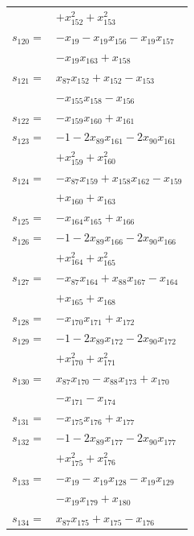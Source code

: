 \begin{longtable}{@{}r@{\;}l@{}}
 & \(\displaystyle +x_{152}^{2} +x_{153}^{2}\) \\[3pt]
\(s_{120}=\) & \(\displaystyle -x_{19} -x_{19}x_{156} -x_{19}x_{157}\) \\
 & \(\displaystyle -x_{19}x_{163} +x_{158}\) \\[3pt]
\(s_{121}=\) & \(\displaystyle x_{87}x_{152} +x_{152} -x_{153}\) \\
 & \(\displaystyle -x_{155}x_{158} -x_{156}\) \\[3pt]
\(s_{122}=\) & \(\displaystyle -x_{159}x_{160} +x_{161}\) \\[3pt]
\(s_{123}=\) & \(\displaystyle -1 -2x_{89}x_{161} -2x_{90}x_{161}\) \\
 & \(\displaystyle +x_{159}^{2} +x_{160}^{2}\) \\[3pt]
\(s_{124}=\) & \(\displaystyle -x_{87}x_{159} +x_{158}x_{162} -x_{159}\) \\
 & \(\displaystyle +x_{160} +x_{163}\) \\[3pt]
\(s_{125}=\) & \(\displaystyle -x_{164}x_{165} +x_{166}\) \\[3pt]
\(s_{126}=\) & \(\displaystyle -1 -2x_{89}x_{166} -2x_{90}x_{166}\) \\
 & \(\displaystyle +x_{164}^{2} +x_{165}^{2}\) \\[3pt]
\(s_{127}=\) & \(\displaystyle -x_{87}x_{164} +x_{88}x_{167} -x_{164}\) \\
 & \(\displaystyle +x_{165} +x_{168}\) \\[3pt]
\(s_{128}=\) & \(\displaystyle -x_{170}x_{171} +x_{172}\) \\[3pt]
\(s_{129}=\) & \(\displaystyle -1 -2x_{89}x_{172} -2x_{90}x_{172}\) \\
 & \(\displaystyle +x_{170}^{2} +x_{171}^{2}\) \\[3pt]
\(s_{130}=\) & \(\displaystyle x_{87}x_{170} -x_{88}x_{173} +x_{170}\) \\
 & \(\displaystyle -x_{171} -x_{174}\) \\[3pt]
\(s_{131}=\) & \(\displaystyle -x_{175}x_{176} +x_{177}\) \\[3pt]
\(s_{132}=\) & \(\displaystyle -1 -2x_{89}x_{177} -2x_{90}x_{177}\) \\
 & \(\displaystyle +x_{175}^{2} +x_{176}^{2}\) \\[3pt]
\(s_{133}=\) & \(\displaystyle -x_{19} -x_{19}x_{128} -x_{19}x_{129}\) \\
 & \(\displaystyle -x_{19}x_{179} +x_{180}\) \\[3pt]
\(s_{134}=\) & \(\displaystyle x_{87}x_{175} +x_{175} -x_{176}\) \\

\end{longtable}
